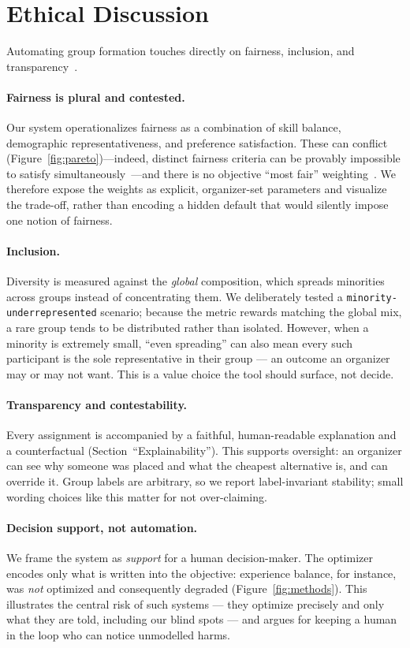 \documentclass[11pt]{article}
\begin{document}
\section{Ethical Discussion}
\label{sec:ethics}
Automating group formation touches directly on fairness, inclusion, and
transparency~\cite{fairml,mehrabi}.

\paragraph{Fairness is plural and contested.} Our system operationalizes fairness as a
combination of skill balance, demographic representativeness, and preference satisfaction.
These can conflict (Figure~\ref{fig:pareto})---indeed, distinct fairness criteria can be
provably impossible to satisfy simultaneously~\cite{kleinberg}---and there is no objective
``most fair'' weighting~\cite{dwork}. We therefore expose the weights as explicit, organizer-set parameters and
visualize the trade-off, rather than encoding a hidden default that would silently impose
one notion of fairness.

\paragraph{Inclusion.} Diversity is measured against the \emph{global} composition, which
spreads minorities across groups instead of concentrating them. We deliberately tested a
\texttt{minority-underrepresented} scenario; because the metric rewards matching the global
mix, a rare group tends to be distributed rather than isolated. However, when a minority is
extremely small, ``even spreading'' can also mean every such participant is the sole
representative in their group --- an outcome an organizer may or may not want. This is a
value choice the tool should surface, not decide.

\paragraph{Transparency and contestability.} Every assignment is accompanied by a faithful,
human-readable explanation and a counterfactual (Section~``Explainability''). This supports
oversight: an organizer can see why someone was placed and what the cheapest alternative is,
and can override it. Group labels are arbitrary, so we report label-invariant stability;
small wording choices like this matter for not over-claiming.

\paragraph{Decision support, not automation.} We frame the system as \emph{support} for a
human decision-maker. The optimizer encodes only what is written into the objective:
experience balance, for instance, was \emph{not} optimized and consequently degraded
(Figure~\ref{fig:methods}). This illustrates the central risk of such systems --- they
optimize precisely and only what they are told, including our blind spots --- and argues for
keeping a human in the loop who can notice unmodelled harms.
\end{document}
